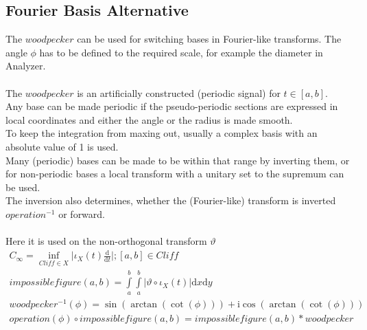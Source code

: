 \documentclass{report}
\begin{document}
\subsection{Fourier Basis Alternative}
The $woodpecker$ can be used for switching bases in Fourier-like transforms. The angle $\phi$ has to be defined to the required scale, for example the diameter in Analyzer.\\\\
The $woodpecker$ is an artificially constructed (periodic signal) for $t \in [a,b]$.\\
Any base can be made periodic if the pseudo-periodic sections are expressed in local coordinates and either the angle or the radius is made smooth.\\
To keep the integration from maxing out, usually a complex basis with an absolute value of 1 is used.\\
Many (periodic) bases can be made to be within that range by inverting them, or for non-periodic bases a local transform with a unitary set to the supremum can be used.\\
The inversion also determines, whether the (Fourier-like) transform is inverted $operation^{-1}$ or forward.\\\\
Here it is used on the non-orthogonal transform $\vartheta$
\begin{align}
C_{\infty}=\inf_{Cliff \in X} \lvert \iota_{X}(t) \frac{\mathrm{d}}{\mathrm{d}t} \rvert; [a,b] \in Cliff\\
impossiblefigure(a,b)=\int \limits _{a}^{b} \int \limits _{a}^{b} \lvert\vartheta \circ \iota_{X}(t)\rvert\mathrm{d}x\mathrm{d}y\\
woodpecker^{-1}(\phi)=\sin(\arctan(\cot(\phi))) + \mathrm{i} \cos(\arctan(\cot(\phi)))\\
operation(\phi) \circ impossiblefigure(a,b)=impossiblefigure(a,b)*woodpecker
\end{align}
\end{document}
